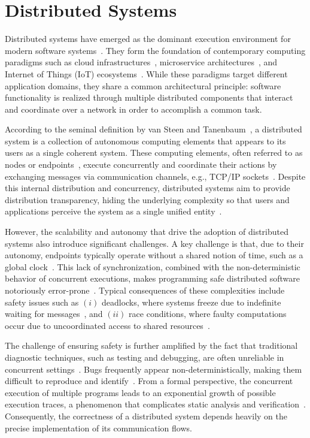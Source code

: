 \section{Distributed Systems}
Distributed systems have emerged as the dominant execution environment for modern software systems~\cite{SteenTanenbaum2016}. They form the foundation of contemporary computing paradigms such as cloud infrastructures~\cite{Armbrust2010}, microservice architectures~\cite{Dragoni2017}, and Internet of Things (IoT) ecosystems~\cite{Atzori2010}. While these paradigms target different application domains, they share a common architectural principle: software functionality is realized through multiple distributed components that interact and coordinate over a network in order to accomplish a common task.

According to the seminal definition by van Steen and Tanenbaum~\cite{SteenTanenbaum2016}, a distributed system is a collection of autonomous computing elements that appears to its users as a single coherent system. These computing elements, often referred to as nodes or endpoints~\cite{Montesi2013}, execute concurrently and coordinate their actions by exchanging messages via communication channels, e.g., TCP/IP sockets~\cite{Braden1989}. Despite this internal distribution and concurrency, distributed systems aim to provide distribution transparency, hiding the underlying complexity so that users and applications perceive the system as a single unified entity~\cite{SteenTanenbaum2016}.

However, the scalability and autonomy that drive the adoption of distributed systems also introduce significant challenges. A key challenge is that, due to their autonomy, endpoints typically operate without a shared notion of time, such as a global clock~\cite{Lamport2019}. This lack of synchronization, combined with the non-deterministic behavior of concurrent executions, makes programming safe distributed software notoriously error-prone~\cite{Montesi2013}. Typical consequences of these complexities include safety issues such as $(i)$ deadlocks, where systems freeze due to indefinite waiting for messages~\cite{Coffman1971}, and $(ii)$ race conditions, where faulty computations occur due to uncoordinated access to shared resources~\cite{NetzerMiller1992}.

The challenge of ensuring safety is further amplified by the fact that traditional diagnostic techniques, such as testing and debugging, are often unreliable in concurrent settings~\cite{Bianchi2018}. Bugs frequently appear non-deterministically, making them difficult to reproduce and identify~\cite{McDowellHelmbold, Heisenbugs}. From a formal perspective, the concurrent execution of multiple programs leads to an exponential growth of possible execution traces, a phenomenon that complicates static analysis and verification~\cite{Montesi2013}. Consequently, the correctness of a distributed system depends heavily on the precise implementation of its communication flows.

